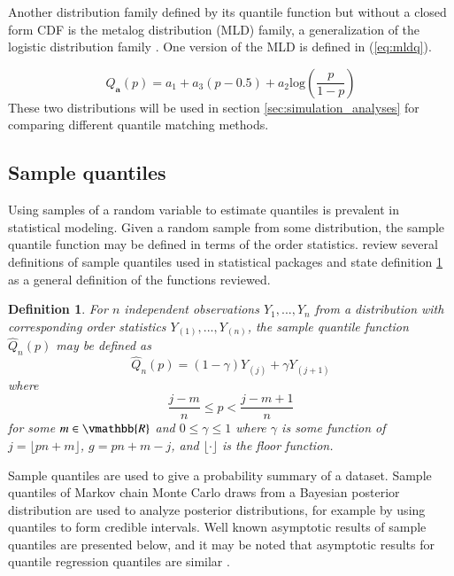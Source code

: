 \documentclass[preprint,12pt,authoryear]{elsarticle}
\newtheorem{definition}{Definition}
\begin{document}
Another distribution family defined by its quantile function but without a closed form CDF is the metalog distribution (MLD) family, a generalization of the logistic distribution family \cite[]{keelin2016metalog}. One version of the MLD is defined in (\ref{eq:mldq}).

\begin{equation}
    \label{eq:mldq}
    Q_{\textbf{a}}(p) = a_1 + a_3(p - 0.5) + a_2\text{log}\left(\frac{p}{1-p} \right)
\end{equation}
These two distributions will be used in section \ref{sec:simulation_analyses} for comparing different quantile matching methods.


















\subsection{Sample quantiles} \label{sec:samp_quants}

Using samples of a random variable to estimate quantiles is prevalent in statistical modeling. Given a random sample from some distribution, the sample quantile function may be defined in terms of the order statistics. \cite{hyndman1996sample} review several definitions of sample quantiles used in statistical packages and state definition \ref{def:sqf} as a general definition of the functions reviewed. 

\begin{definition}
For $n$ independent observations $Y_1, ..., Y_n$ from a distribution with corresponding order statistics $Y_{(1)}, ..., Y_{(n)}$, the sample quantile function $\hat{Q}_n(p)$ may be defined as
    \label{def:sqf}
    \begin{equation}
        \label{eq:quant_df}
        \hat{Q}_n(p) = (1- \gamma)Y_{(j)} + \gamma Y_{(j + 1)}
    \end{equation}
    where 
    \[\frac{j - m}{n} \leq p < \frac{j - m + 1}{n}
    \]
    for some $m \in \vmathbb{R}$ and $0 \leq \gamma \leq 1$ where $\gamma$ is some function of $j = \lfloor pn + m \rfloor$,  $g = pn + m - j$, and $\lfloor \cdot \rfloor$ is the floor function.
\end{definition}

Sample quantiles are used to give a probability summary of a dataset. Sample quantiles of Markov chain Monte Carlo draws from a Bayesian posterior distribution are used to analyze posterior distributions, for example by using quantiles to form credible intervals. 
Well known asymptotic results of sample quantiles are presented below, and it may be noted that asymptotic results for quantile regression quantiles are similar \cite[]{kocherginsky2005practical, koenker1978regression}. 
\end{document}
